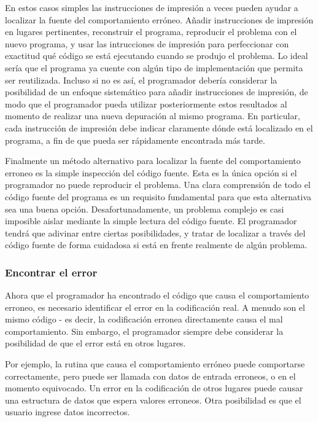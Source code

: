 \documentclass[12pt,a4paper]{report}
\begin{document}
En estos casos simples las instrucciones de impresión a veces pueden ayudar a localizar la fuente del comportamiento erróneo. Añadir instrucciones de impresión en lugares pertinentes, reconstruir el programa, reproducir el problema con el nuevo programa, y usar las intrucciones de impresión para perfeccionar con exactitud qué código se está ejecutando cuando se produjo el problema.  Lo ideal sería que el programa ya cuente con algún tipo de implementación que permita ser reutilizada. Incluso si no es así, el programador debería considerar la posibilidad de un enfoque sistemático para añadir instrucciones de impresión, de modo que el programador pueda utilizar posteriormente estos resultados al momento de realizar una nueva depuración al mismo programa. En particular, cada instrucción de impresión debe indicar claramente dónde está localizado en el programa, a fin de que pueda ser rápidamente encontrada más tarde.

Finalmente un método alternativo para localizar la fuente del comportamiento erroneo es la simple inspección del código fuente. Esta es la única opción si el programador no puede reproducir el problema. Una clara comprensión de todo el código fuente del programa es un requisito fundamental para que esta alternativa sea una buena opción. Desafortunadamente, un problema complejo es casi imposible aislar mediante la simple lectura del código fuente.  El programador tendrá que adivinar entre ciertas posibilidades, y tratar de localizar a través del código fuente de forma cuidadosa si está en frente realmente de algún problema.


\subsubsection{Encontrar el error}

Ahora que el programador ha encontrado el código que causa el comportamiento erroneo, es necesario identificar el error en la codificación real. A menudo son el mismo código - es decir, la codificación erronea directamente causa el mal comportamiento. Sin embargo, el programador siempre debe considerar la posibilidad de que el error está en otros lugares.

Por ejemplo, la rutina que causa el comportamiento erróneo puede comportarse correctamente, pero puede ser llamada con datos de entrada erroneos, o en el momento equivocado. Un error en la codificación de otros lugares puede causar una estructura de datos que espera valores erroneos. Otra posibilidad es que el usuario ingrese datos incorrectos.
\end{document}
